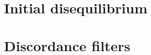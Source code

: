 \begin{refsection}
\begin{enumerate}
\begin{enumerate}
  \end{enumerate}
\end{enumerate}

\section{Initial disequilibrium}
\label{sec:U-Pb-disequilibrium}

\section{Discordance filters}
\label{sec:discfilter}

\printbibliography[heading=subbibliography]

\end{refsection}
